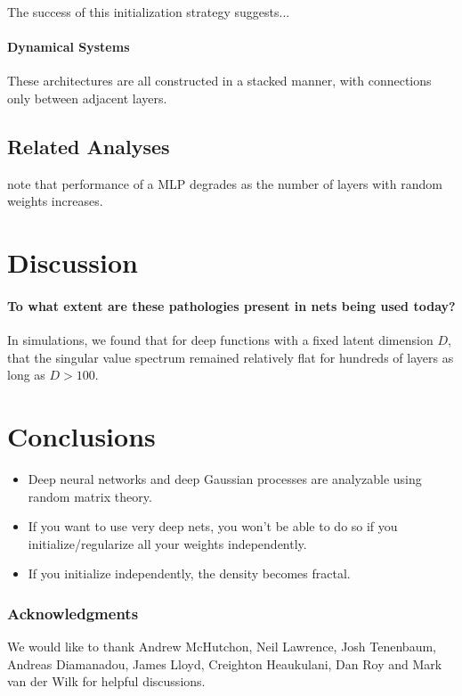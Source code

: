 \documentclass{article}
\begin{document}
The success of this initialization strategy suggests...

\paragraph{Dynamical Systems}
These architectures are all constructed in a stacked manner, with connections only between adjacent layers.


\subsection{Related Analyses}

\cite{montavon2010layer} note that performance of a MLP degrades as the number of layers with random weights increases.

\section{Discussion}

\paragraph{To what extent are these pathologies present in nets being used today?}  In simulations, we found that for deep functions with a fixed latent dimension $D$, that the singular value spectrum remained relatively flat for hundreds of layers as long as $D > 100$.






\section{Conclusions}

\begin{itemize}
\item Deep neural networks and deep Gaussian processes are analyzable using random matrix theory.
\item If you want to use very deep nets, you won't be able to do so if you initialize/regularize all your weights independently.
\item If you initialize independently, the density becomes fractal.
\end{itemize}


\subsubsection*{Acknowledgments}

We would like to thank Andrew McHutchon, Neil Lawrence, Josh Tenenbaum, Andreas Diamanadou, James Lloyd, Creighton Heaukulani, Dan Roy and Mark van der Wilk for helpful discussions.



\end{document}
